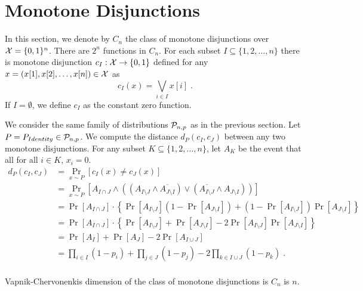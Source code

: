 \section{Monotone Disjunctions}
\label{section:monotone-dijsunctions}

In this section, we denote by $C_n$ the class of monotone disjunctions over $\X = \{0,1\}^n$. There
are $2^n$ functions in $C_n$. For each subset $I \subseteq \{1,2,\dots,n\}$
there is monotone disjunction $c_I:\X \to \{0,1\}$ defined for any $x = (x[1],
x[2], \dots, x[n]) \in \X$ as
$$
c_I(x) = \bigvee_{i \in I} x[i] \; .
$$
If $I = \emptyset$, we define $c_I$ as the constant zero function.

We consider the same family of distributions $\P_{n,p}$ as in the previous section.
Let $P = P_{Identity} \in \P_{n,p}$. We compute the distance $d_P(c_I, c_J)$ between
any two monotone disjunctions. For any subset $K \subseteq \{1,2,\dots,n\}$, let
$A_K$ be the event that all for all $i \in K$, $x_i = 0$.
\begin{align*}
d_P(c_I, c_J)
& = \Pr_{x \sim P}[c_I(x) \neq c_J(x)] \\
& = \Pr_{x \sim P}[A_{I \cap J} \wedge ((A_{I \setminus J} \wedge \overline{A_{J \setminus I}}) \vee (\overline{A_{I \setminus J}} \wedge A_{J \setminus I} )) ] \\
& = \Pr[A_{I \cap J}] \cdot \left\{ \Pr[A_{I \setminus J}] (1 - \Pr[A_{J \setminus I}]) + (1 - \Pr[A_{I \setminus J}]) \Pr[A_{J \setminus I}] \right\} \\
& = \Pr[A_{I \cap J}] \cdot \left\{ \Pr[A_{I \setminus J}] + \Pr[A_{J \setminus I}] - 2 \Pr[A_{I \setminus J}] \Pr[A_{J \setminus I}] \right\} \\
& = \Pr[A_I] + \Pr[A_J] - 2 \Pr[A_{I \cup J}] \\
& = \prod_{i \in I} (1 - p_i) + \prod_{j \in J} (1 - p_j) - 2 \prod_{k \in I \cup J} (1 - p_k) \; . \\
\end{align*}

\begin{proposition}
Vapnik-Chervonenkis dimension of the class of monotone disjunctions is $C_n$ is $n$.
\end{proposition}

